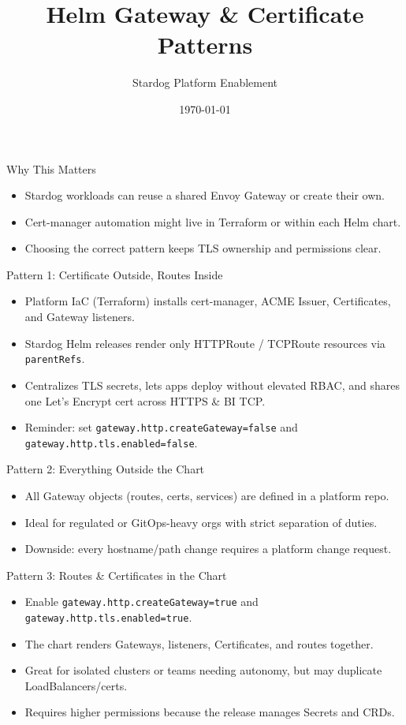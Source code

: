 \documentclass{beamer}
\title{Helm Gateway \& Certificate Patterns}
\author{Stardog Platform Enablement}
\date{\today}
\begin{document}
\frame{\titlepage}

\begin{frame}{Why This Matters}
\begin{itemize}
  \item Stardog workloads can reuse a shared Envoy Gateway or create their own.
  \item Cert-manager automation might live in Terraform or within each Helm chart.
  \item Choosing the correct pattern keeps TLS ownership and permissions clear.
\end{itemize}
\end{frame}

\begin{frame}{Pattern 1: Certificate Outside, Routes Inside}
\begin{itemize}
  \item Platform IaC (Terraform) installs cert-manager, ACME Issuer, Certificates, and Gateway listeners.
  \item Stardog Helm releases render only HTTPRoute / TCPRoute resources via \texttt{parentRefs}.
  \item Centralizes TLS secrets, lets apps deploy without elevated RBAC, and shares one Let's Encrypt cert across HTTPS \& BI TCP.
  \item Reminder: set \texttt{gateway.http.createGateway=false} and \texttt{gateway.http.tls.enabled=false}.
\end{itemize}
\end{frame}

\begin{frame}{Pattern 2: Everything Outside the Chart}
\begin{itemize}
  \item All Gateway objects (routes, certs, services) are defined in a platform repo.
  \item Ideal for regulated or GitOps-heavy orgs with strict separation of duties.
  \item Downside: every hostname/path change requires a platform change request.
\end{itemize}
\end{frame}

\begin{frame}{Pattern 3: Routes \& Certificates in the Chart}
\begin{itemize}
  \item Enable \texttt{gateway.http.createGateway=true} and \texttt{gateway.http.tls.enabled=true}.
  \item The chart renders Gateways, listeners, Certificates, and routes together.
  \item Great for isolated clusters or teams needing autonomy, but may duplicate LoadBalancers/certs.
  \item Requires higher permissions because the release manages Secrets and CRDs.
\end{itemize}
\end{frame}
\end{document}
